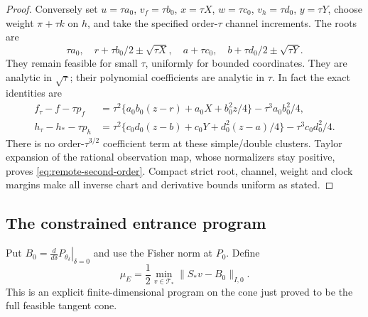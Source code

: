 \begin{proof}
Conversely set $u=\tau a_0$, $v_f=\tau b_0$, $x=\tau X$,
$w=\tau c_0$, $v_h=\tau d_0$, $y=\tau Y$, choose weight
$\pi+\tau k$ on $h$, and take the specified order-$\tau$ channel
increments. The roots are
\[
 \tau a_0,\quad r+\tau b_0/2\pm\sqrt{\tau X},\quad
 a+\tau c_0,\quad b+\tau d_0/2\pm\sqrt{\tau Y}.
\]
They remain feasible for small $\tau$, uniformly for bounded coordinates.
They are analytic in $\sqrt\tau$; their polynomial coefficients are
analytic in $\tau$. In fact the exact identities are
\begin{align}
 f_\tau-f-\tau p_f
 &=\tau^2\{a_0b_0(z-r)+a_0X+b_0^2z/4\}
                         -\tau^3a_0b_0^2/4,\label{eq:remote-f-identity}\\
 h_\tau-h_*-\tau p_h
 &=\tau^2\{c_0d_0(z-b)+c_0Y+d_0^2(z-a)/4\}
                         -\tau^3c_0d_0^2/4.\label{eq:remote-h-identity}
\end{align}
There is no order-$\tau^{3/2}$ coefficient term at these simple/double
clusters. Taylor expansion of the rational observation map, whose
normalizers stay positive, proves \eqref{eq:remote-second-order}.
Compact strict root, channel, weight and clock margins make all inverse
chart and derivative bounds uniform as stated.
\end{proof}

\subsection{The constrained entrance program}
Put $B_0=\left.\frac{d}{d\delta}P_{\theta_\delta}\right|_{\delta=0}$
and use the Fisher norm at $P_0$. Define
\begin{equation}\label{eq:mu}
 \mu_E=\frac12\min_{v\in\mathcal T_*}\|S_*v-B_0\|_{I,0}.
\end{equation}
This is an explicit finite-dimensional program on the cone just proved
to be the full feasible tangent cone.

